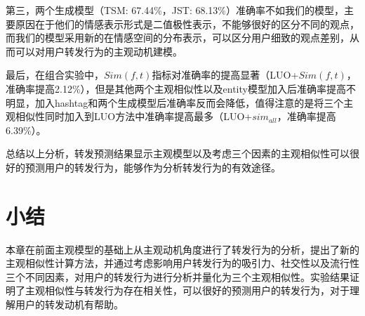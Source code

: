 第三，两个生成模型（TSM: 67.44\%，JST: 68.13\%）准确率不如我们的模型，主要原因在于他们的情感表示形式是二值极性表示，不能够很好的区分不同的观点，而我们的模型采用新的在情感空间的分布表示，可以区分用户细致的观点差别，从而可以对用户转发行为的主观动机建模。

最后，在组合实验中，$ Sim(f,t) $指标对准确率的提高显著（LUO+$ Sim(f,t) $，准确率提高2.12\%），但是其他两个主观相似性以及entity模型加入后准确率提高不明显，加入hashtag和两个生成模型后准确率反而会降低，值得注意的是将三个主观相似性同时加入到LUO方法中准确率提高最多（LUO+$ sim_{all}  $，准确率提高6.39\%）。

总结以上分析，转发预测结果显示主观模型以及考虑三个因素的主观相似性可以很好的预测用户的转发行为，能够作为分析转发行为的有效途径。

\section{小结}
本章在前面主观模型的基础上从主观动机角度进行了转发行为的分析，提出了新的主观相似性计算方法，并通过考虑影响用户转发行为的吸引力、社交性以及流行性三个不同因素，对用户的转发行为进行分析并量化为三个主观相似性。实验结果证明了主观相似性与转发行为存在相关性，可以很好的预测用户的转发行为，对于理解用户的转发动机有帮助。

